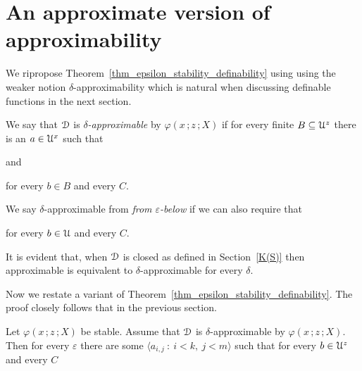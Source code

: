 \section{An approximate version of approximability}

We ripropose Theorem~\ref{thm_epsilon_stability_definability} using using the weaker notion $\delta$-approximability which is natural when discussing definable functions in the next section.

\begin{definition}\label{def_approx_X}\strut
  We say that ${\EuScript D}$ is \emph{$\delta$-approximable\/} by $\varphi(x\,;z\,;X)$ if for every finite $B\subseteq{\EuScript U}^z$ there is an $a\in{\EuScript U}^x$ such that\smallskip

  \quad and\smallskip

  \hfill for every $b\in B$ and every $C$.\smallskip

   We say  $\delta$-approximable from \emph{from $\varepsilon$-below\/} if we can also require that\smallskip

  \hfill for every $b\in{\EuScript U}$ and every $C$.

\end{definition}
It is evident that, when ${\EuScript D}$ is closed as defined in Section~\ref{K(S)} then approximable is equivalent to $\delta$-approximable for every $\delta$.

 Now we restate a variant of Theorem~\ref{thm_epsilon_stability_definability}.
 The proof closely follows that in the previous section.

\begin{theorem}\label{thm_epsilon_delta_stability_definability}
  Let $\varphi(x\,;z\,;X)$ be stable.
  Assume that ${\EuScript D}$ is $\delta$-approximable by $\varphi(x\,;z\,;X)$.
  Then for every $\varepsilon$ there are some $\langle a_{i,j}\ :\ i< k,\ j<m\rangle$ such that for every $b\in{\EuScript U}^z$ and every $C$\medskip

  \medskip

\end{theorem}

